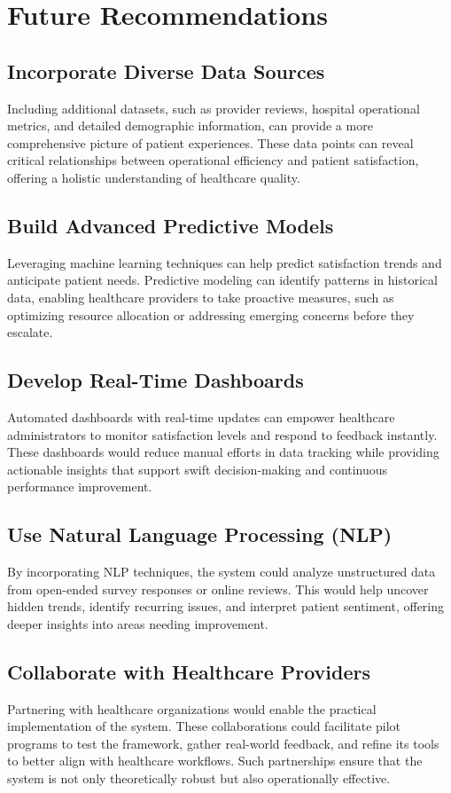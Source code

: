 \section{Future Recommendations}

\subsection{Incorporate Diverse Data Sources}
Including additional datasets, such as provider reviews, hospital operational metrics, and detailed demographic information, can provide a more comprehensive picture of patient experiences. These data points can reveal critical relationships between operational efficiency and patient satisfaction, offering a holistic understanding of healthcare quality.

\subsection{Build Advanced Predictive Models}
Leveraging machine learning techniques can help predict satisfaction trends and anticipate patient needs. Predictive modeling can identify patterns in historical data, enabling healthcare providers to take proactive measures, such as optimizing resource allocation or addressing emerging concerns before they escalate.

\subsection{Develop Real-Time Dashboards}
Automated dashboards with real-time updates can empower healthcare administrators to monitor satisfaction levels and respond to feedback instantly. These dashboards would reduce manual efforts in data tracking while providing actionable insights that support swift decision-making and continuous performance improvement.

\subsection{Use Natural Language Processing (NLP)}
By incorporating NLP techniques, the system could analyze unstructured data from open-ended survey responses or online reviews. This would help uncover hidden trends, identify recurring issues, and interpret patient sentiment, offering deeper insights into areas needing improvement.

\subsection{Collaborate with Healthcare Providers}
Partnering with healthcare organizations would enable the practical implementation of the system. These collaborations could facilitate pilot programs to test the framework, gather real-world feedback, and refine its tools to better align with healthcare workflows. Such partnerships ensure that the system is not only theoretically robust but also operationally effective.


